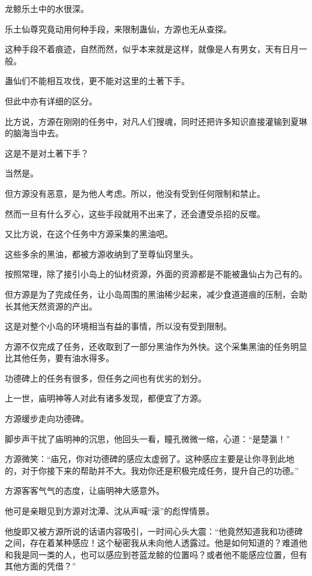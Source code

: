 \begin{this_body}
龙鲸乐土中的水很深。

乐土仙尊究竟动用何种手段，来限制蛊仙，方源也无从查探。

这种手段不着痕迹，自然而然，似乎本来就是这样，就像是人有男女，天有日月一般。

蛊仙们不能相互攻伐，更不能对这里的土著下手。

但此中亦有详细的区分。

比方说，方源在刚刚的任务中，对凡人们搜魂，同时还把许多知识直接灌输到夏琳的脑海当中去。

这是不是对土著下手？

当然是。

但方源没有恶意，是为他人考虑。所以，他没有受到任何限制和禁止。

然而一旦有什么歹心，这些手段就用不出来了，还会遭受杀招的反噬。

又比方说，在这个任务中方源采集的黑油吧。

这些多余的黑油，都被方源收纳到了至尊仙窍里头。

按照常理，除了接引小岛上的仙材资源，外面的资源都是不能被蛊仙占为己有的。

但方源是为了完成任务，让小岛周围的黑油稀少起来，减少食道道痕的压制，会助长其他天然资源的产出。

这是对整个小岛的环境相当有益的事情，所以没有受到限制。

方源不仅完成了任务，还收取到了一部分黑油作为外快。这个采集黑油的任务明显比其他任务，要有油水得多。

功德碑上的任务有很多，但任务之间也有优劣的划分。

上一世，庙明神等人对此有诸多发现，都便宜了方源。

方源缓步走向功德碑。

脚步声干扰了庙明神的沉思，他回头一看，瞳孔微微一缩，心道：“是楚瀛！”

方源微笑：“庙兄，你对功德碑的感应太虚弱了。这种感应主要是让你寻到此地的，对于你接下来的帮助并不大。我劝你还是积极完成任务，提升自己的功德。”

方源客客气气的态度，让庙明神大感意外。

他可是亲眼见到方源对沈潭、沈从声喊“滚”的彪悍情景。

他旋即又被方源所说的话语内容吸引，一时间心头大震：“他竟然知道我和功德碑之间，存在着某种感应！这个秘密我从未向他人透露过。他是如何知道的？难道他和我是同一类的人，也可以感应到苍蓝龙鲸的位置吗？或者他不能感应位置，但有其他方面的凭借？”


\end{this_body}
